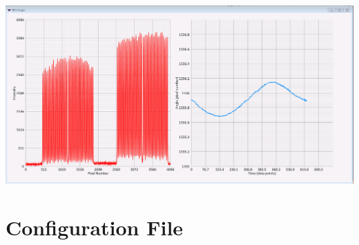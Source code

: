 \documentclass{article}
\begin{document}
\includegraphics[width=\textwidth]{BRSReadoutScreenGraph.png}
\section{Configuration File}
\end{document}

